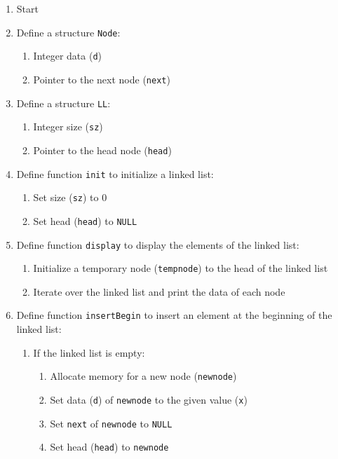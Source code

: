 \documentclass{article}
\begin{document}
\begin{enumerate}
  \item Start
  \item Define a structure \texttt{Node}:
    \begin{enumerate}
      \item Integer data (\texttt{d})
      \item Pointer to the next node (\texttt{next})
    \end{enumerate}
  \item Define a structure \texttt{LL}:
    \begin{enumerate}
      \item Integer size (\texttt{sz})
      \item Pointer to the head node (\texttt{head})
    \end{enumerate}
  \item Define function \texttt{init} to initialize a linked list:
    \begin{enumerate}
      \item Set size (\texttt{sz}) to 0
      \item Set head (\texttt{head}) to \texttt{NULL}
    \end{enumerate}
  \item Define function \texttt{display} to display the elements of the linked list:
    \begin{enumerate}
      \item Initialize a temporary node (\texttt{tempnode}) to the head of the linked list
      \item Iterate over the linked list and print the data of each node
    \end{enumerate}
  \item Define function \texttt{insertBegin} to insert an element at the beginning of the linked list:
    \begin{enumerate}
      \item If the linked list is empty:
        \begin{enumerate}
          \item Allocate memory for a new node (\texttt{newnode})
          \item Set data (\texttt{d}) of \texttt{newnode} to the given value (\texttt{x})
          \item Set \texttt{next} of \texttt{newnode} to \texttt{NULL}
          \item Set head (\texttt{head}) to \texttt{newnode}
        \end{enumerate}

\end{enumerate}
\end{enumerate}
\end{document}

